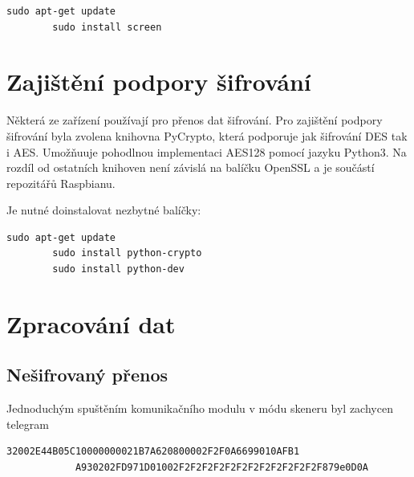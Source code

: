 \begin{lstlisting}[style=MyCodeBash]
		sudo apt-get update
		sudo install screen		
	\end{lstlisting}



\section{Zajištění podpory šifrování}
Některá ze zařízení používají pro přenos dat šifrování. Pro zajištění podpory šifrování byla zvolena knihovna PyCrypto, která podporuje jak šifrování DES tak i AES. 
Umožňuuje pohodlnou implementaci AES128 pomocí jazyku Python3. Na rozdíl od ostatních knihoven není závislá na balíčku OpenSSL a je součástí repozitářů Raspbianu. 

Je nutné doinstalovat nezbytné balíčky:	
 
\begin{lstlisting}[style=MyCodeBash]
		sudo apt-get update
		sudo install python-crypto
		sudo install python-dev
	\end{lstlisting}
	\vspace{-20pt}


\section{Zpracování dat}

\subsection{Nešifrovaný přenos}

Jednoduchým spuštěním komunikačního modulu v módu skeneru byl zachycen telegram

\begin{lstlisting}[style=MyCodePHP]
			32002E44B05C10000000021B7A620800002F2F0A6699010AFB1
			A930202FD971D01002F2F2F2F2F2F2F2F2F2F2F2F2F879e0D0A
\end{lstlisting}

